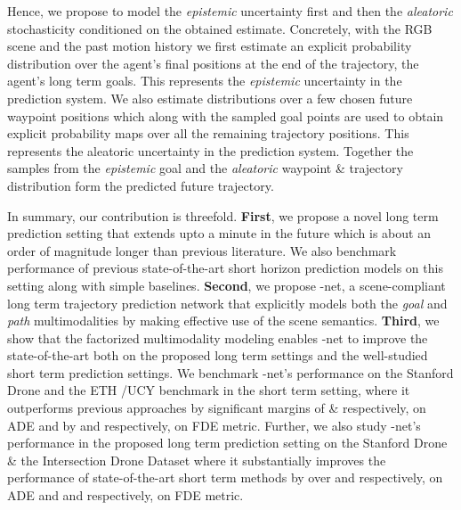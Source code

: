 \documentclass[final]{cvpr}
\begin{document}
Hence, we propose to model the \textit{epistemic} uncertainty first and then the \textit{aleatoric} stochasticity conditioned on the obtained estimate. Concretely, with the RGB scene and the past motion history we first estimate an explicit probability distribution over the agent's final positions at the end of the trajectory, \ie the agent's long term goals. This represents the \textit{epistemic} uncertainty in the prediction system. We also estimate distributions over a few chosen future waypoint positions which along with the sampled goal points are used to obtain explicit probability maps over all the remaining trajectory positions. This represents the aleatoric uncertainty in the prediction system. Together the samples from the \textit{epistemic} goal and the \textit{aleatoric} waypoint \& trajectory distribution form the predicted future trajectory.    

In summary, our contribution is threefold. \textbf{First}, we propose a novel long term prediction setting that extends upto a minute in the future which is about an order of magnitude longer than previous literature. We also benchmark performance of previous state-of-the-art short horizon prediction models on this setting along with simple baselines. \textbf{Second}, we propose -net, a scene-compliant long term trajectory prediction network that explicitly models both the \textit{goal} and \textit{path} multimodalities by making effective use of the scene semantics. \textbf{Third}, we show that the factorized multimodality modeling enables -net to improve the state-of-the-art both on the proposed long term settings and the well-studied short term prediction settings. We benchmark -net's performance on the Stanford Drone \cite{robicquetlearning} and the ETH \cite{pellegrini2010improving}/UCY\cite{lerner2007crowds} benchmark in the short term setting, where it outperforms previous approaches by significant margins of  \&  respectively, on ADE and by  and  respectively, on FDE metric. Further, we also study -net's performance in the proposed long term prediction setting on the Stanford Drone \& the Intersection Drone Dataset \cite{inDdataset} where it substantially improves the performance of state-of-the-art short term methods by over  and  respectively, on ADE and  and  respectively, on FDE metric.  
\end{document}
